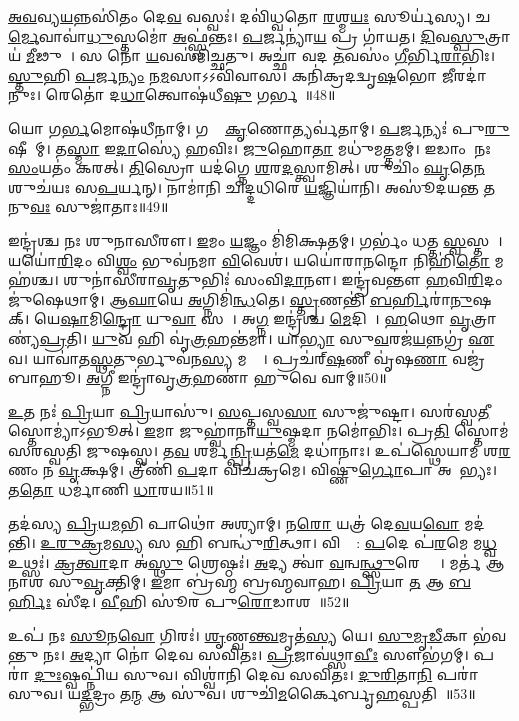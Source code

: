 \ul{𑌅}\ul{𑌵}𑌵𑍍𑌯\ul{𑌯}𑌨𑍍𑌨𑌸𑌿॑𑌤𑌂 𑌦𑍇\ul{𑌵} 𑌵𑌸𑍍𑌵𑌃॑।
𑌦𑌵𑌿॑𑌧𑍍𑌵𑌤𑍋 \ul{𑌰}𑌶𑍍𑌮\ul{𑌯𑌃} 𑌸𑍂𑌰𑍍𑌯॑𑌸𑍍𑌯।
𑌚\ul{𑌰𑍍𑌮𑍇}𑌵𑌾𑌵𑌾॑\ul{𑌧𑍁}𑌸𑍍𑌤𑌮𑍋॑ \ul{𑌅}𑌫𑍍𑌸𑍍𑌵॑𑌨𑍍𑌤𑌃।
\ul{𑌪}𑌰𑍍𑌜𑌨𑍍𑌯𑌾॑\ul{𑌯} 𑌪𑍍𑌰 𑌗𑌾॑𑌯𑌤।
\ul{𑌦𑌿}𑌵\ul{𑌸𑍍𑌪𑍁}𑌤𑍍𑌰𑌾𑌯॑ \ul{𑌮𑍀}𑌢𑍁𑌷𑍇᳚।
𑌸 𑌨𑍋॑ \ul{𑌯}𑌵𑌸॑𑌮𑌿𑌚𑍍𑌛𑌤𑍁।
𑌅𑌚𑍍𑌛𑌾॑ 𑌵𑌦 \ul{𑌤}𑌵𑌸𑌂॑ \ul{𑌗𑍀}𑌰𑍍𑌭𑌿\ul{𑌰𑌾}𑌭𑌿𑌃।
\ul{𑌸𑍍𑌤𑍁}𑌹𑌿 \ul{𑌪}𑌰𑍍𑌜\ul{𑌨𑍍𑌯𑌂} 𑌨\ul{𑌮}𑌸𑌾\-𑌽𑌽𑌵𑌿॑𑌵𑌾𑌸।
𑌕𑌨𑌿॑𑌕𑍍𑌰𑌦𑌦𑍍𑌵𑍃\ul{𑌷}𑌭𑍋 \ul{𑌜𑍀}𑌰𑌦𑌾॑𑌨𑍁𑌃।
𑌰𑍇𑌤𑍋॑ 𑌦\ul{𑌧𑌾}𑌤𑍍𑌵𑍋𑌷॑𑌧𑍀\ul{𑌷𑍁} 𑌗𑌰𑍍𑌭𑌮𑍍᳚॥48॥

𑌯𑍋 𑌗\ul{𑌰𑍍𑌭}𑌮𑍋𑌷॑𑌧𑍀𑌨𑌾𑌮𑍍।
𑌗𑌵𑌾𑌂᳚ \ul{𑌕𑍃}𑌣𑍋𑌤𑍍𑌯𑌰𑍍𑌵॑𑌤𑌾𑌮𑍍।
\ul{𑌪}𑌰𑍍𑌜𑌨𑍍𑌯𑌃॑ 𑌪𑍁\ul{𑌰𑍁}𑌷𑍀𑌣𑌾᳚𑌮𑍍।
𑌤\ul{𑌸𑍍𑌮𑌾} 𑌇\ul{𑌦𑌾}𑌸𑍍𑌯𑍇॑ \ul{𑌹}𑌵𑌿𑌃।
\ul{𑌜𑍁}𑌹𑍋\ul{𑌤𑌾} 𑌮𑌧𑍁॑𑌮𑌤𑍍𑌤𑌮𑌮𑍍।
𑌇𑌡𑌾𑌂 𑌨𑌃 \ul{𑌸𑌂}𑌯𑌤𑌂॑ 𑌕𑌰𑌤𑍍।
\ul{𑌤𑌿}𑌸𑍍𑌰𑍋 𑌯𑌦॑𑌗𑍍𑌨𑍇 \ul{𑌶}𑌰\ul{𑌦}𑌸𑍍𑌤𑍍𑌵𑌾𑌮𑌿𑌤𑍍।
𑌶𑍁𑌚𑌿𑌂॑ \ul{𑌘𑍃}𑌤𑍇\ul{𑌨} 𑌶𑍁𑌚॑𑌯𑌃 𑌸\ul{𑌪}𑌰𑍍𑌯𑌨𑍍।
𑌨𑌾𑌮𑌾॑𑌨𑌿 𑌚𑌿𑌦𑍍𑌦𑌧𑌿𑌰𑍇 \ul{𑌯}𑌜𑍍𑌞𑌿𑌯𑌾॑𑌨𑌿।
𑌅𑌸𑍂॑𑌦𑌯𑌨𑍍𑌤 \ul{𑌤}𑌨𑍁\ul{𑌵𑌃} 𑌸𑍁𑌜𑌾॑𑌤𑌾𑌃॥49॥

𑌇𑌨𑍍𑌦𑍍𑌰॑𑌶𑍍𑌚 𑌨𑌃 𑌶𑍁𑌨𑌾𑌸𑍀𑌰𑍗।
\ul{𑌇}𑌮𑌂 \ul{𑌯}𑌜𑍍𑌞𑌂 𑌮𑌿॑𑌮𑌿𑌕𑍍𑌷𑌤𑌮𑍍।
𑌗𑌰𑍍𑌭𑌂॑ 𑌧𑌤𑍍𑌤 \ul{𑌸𑍍𑌵}𑌸𑍍𑌤𑌯𑍇᳚।
𑌯𑌯𑍋॑\ul{𑌰𑌿}𑌦𑌂 𑌵𑌿\ul{𑌶𑍍𑌵𑌂} 𑌭𑍁𑌵॑𑌨𑌮𑌾 \ul{𑌵𑌿}𑌵𑍇𑌶॑।
𑌯𑌯𑍋॑𑌰𑌾\ul{𑌨}𑌨𑍍𑌦𑍋 𑌨𑌿𑌹𑌿॑\ul{𑌤𑍋} 𑌮𑌹॑𑌶𑍍𑌚।
𑌶𑍁𑌨𑌾॑𑌸𑍀𑌰𑌾\ul{𑌵𑍃}𑌤𑍁𑌭𑌿𑌃॑ 𑌸𑌂𑌵𑌿\ul{𑌦𑌾}𑌨𑍗।
𑌇𑌨𑍍𑌦𑍍𑌰॑𑌵𑌨𑍍𑌤𑍗 \ul{𑌹}𑌵𑌿\ul{𑌰𑌿}𑌦𑌂 𑌜𑍁॑𑌷𑍇𑌥𑌾𑌮𑍍।
𑌆\ul{𑌘𑌾}𑌯𑍇 \ul{𑌅}𑌗𑍍𑌨𑌿𑌮𑌿॑\ul{𑌨𑍍𑌧}𑌤𑍇।
\ul{𑌸𑍍𑌤𑍃}𑌣𑌨𑍍𑌤𑌿॑ \ul{𑌬}\ul{𑌰𑍍}𑌹𑌿𑌰𑌾॑\ul{𑌨𑍁}𑌷𑌕𑍍।
𑌯𑍇\ul{𑌷𑌾}𑌮𑌿\ul{𑌨𑍍𑌦𑍍𑌰𑍋} 𑌯𑍁\ul{𑌵𑌾} 𑌸𑌖𑌾᳚।
𑌅\ul{𑌗𑍍𑌨} 𑌇𑌨𑍍𑌦𑍍𑌰॑𑌶𑍍𑌚 \ul{𑌮𑍇}𑌦𑌿𑌨𑌾᳚।
\ul{𑌹}𑌥𑍋 \ul{𑌵𑍃}𑌤𑍍𑌰𑌾𑌣𑍍𑌯॑\ul{𑌪𑍍𑌰}𑌤𑌿।
\ul{𑌯𑍁}𑌵 𑌹𑌿 𑌵𑍃॑\ul{𑌤𑍍𑌰}𑌹𑌨𑍍𑌤॑𑌮𑌾।
𑌯𑌾\ul{𑌭𑍍𑌯𑌾}\ul{} 𑌸𑍁\ul{𑌵}𑌰𑌜॑\ul{𑌯}𑌨𑍍𑌨𑌗𑍍𑌰॑ \ul{𑌏}𑌵।
𑌯𑌾𑌵𑌾॑𑌤\ul{𑌸𑍍𑌥}𑌤𑍁𑌰𑍍𑌭𑍁𑌵॑𑌨\ul{𑌸𑍍𑌯} 𑌮𑌧𑍍𑌯𑍇᳚।
𑌪𑍍𑌰𑌚॑𑌰𑍍‌\mbox{}\ul{𑌷}𑌣𑍀 𑌵𑍃॑𑌷\ul{𑌣𑌾} 𑌵𑌜𑍍𑌰॑𑌬𑌾𑌹𑍂।
\ul{𑌅}𑌗𑍍𑌨𑍀 𑌇𑌨𑍍𑌦𑍍𑌰𑌾॑𑌵𑍃\ul{𑌤𑍍𑌰}𑌹𑌣𑌾॑ 𑌹𑍁𑌵𑍇 𑌵𑌾𑌮𑍍॥50॥\anuvakamend[𑌮\ul{𑌨} 𑌇\ul{𑌨𑍍𑌦𑍍𑌰𑍋} 𑌗𑌵𑌿॑𑌷𑍍𑌟𑌿\ul{𑌷𑍁} 𑌤\ul{𑌨𑍍𑌤𑍁𑌂} 𑌗\ul{𑌰𑍍𑌭}\ul{\dng{ꣳ}} 𑌸𑍁𑌜𑌾॑\ul{𑌤𑌾𑌃} 𑌸𑌖𑌾॑ \ul{𑌸}𑌪𑍍𑌤 𑌚॑]

\ul{𑌉}𑌤 𑌨𑌃॑ \ul{𑌪𑍍𑌰𑌿}𑌯𑌾 \ul{𑌪𑍍𑌰𑌿}𑌯𑌾𑌸𑍁॑।
\ul{𑌸}𑌪𑍍𑌤𑌸𑍍𑌵\ul{𑌸𑌾} 𑌸𑍁𑌜𑍁॑𑌷𑍍𑌟𑌾।
𑌸𑌰॑𑌸𑍍𑌵\ul{𑌤𑍀} 𑌸𑍍𑌤𑍋𑌮𑍍𑌯𑌾॑\-𑌽𑌭𑍂𑌤𑍍।
\ul{𑌇}𑌮𑌾 𑌜𑍁𑌹𑍍𑌵𑌾॑𑌨𑌾\ul{𑌯𑍁}𑌷𑍍𑌮𑌦𑌾 𑌨𑌮𑍋॑𑌭𑌿𑌃।
𑌪𑍍𑌰\ul{𑌤𑌿} 𑌸𑍍𑌤𑍋𑌮॑ 𑌸𑌰𑌸𑍍𑌵𑌤𑌿 𑌜𑍁𑌷𑌸𑍍𑌵।
𑌤\ul{𑌵} 𑌶𑌰𑍍𑌮॑\ul{𑌨𑍍𑌪𑍍𑌰𑌿}𑌯𑌤॑\ul{𑌮𑍇} 𑌦𑌧𑌾॑𑌨𑌾𑌃।
𑌉𑌪॑𑌸𑍍𑌥𑍇𑌯𑌾𑌮 𑌶\ul{𑌰}𑌣𑌂 𑌨 \ul{𑌵𑍃}𑌕𑍍𑌷𑌮𑍍।
𑌤𑍍𑌰𑍀𑌣𑌿॑ \ul{𑌪}𑌦𑌾 𑌵𑌿𑌚॑𑌕𑍍𑌰𑌮𑍇।
𑌵𑌿𑌷𑍍𑌣𑍁॑\ul{𑌰𑍍𑌗𑍋}𑌪𑌾 𑌅𑌦𑌾᳚𑌭𑍍𑌯𑌃।
𑌤\ul{𑌤𑍋} 𑌧𑌰𑍍𑌮𑌾॑𑌣𑌿 \ul{𑌧𑌾}𑌰𑌯\sn{}॥51॥

𑌤𑌦॑𑌸𑍍𑌯 \ul{𑌪𑍍𑌰𑌿}𑌯\ul{𑌮}𑌭𑌿 𑌪𑌾𑌥𑍋॑ 𑌅𑌶𑍍𑌯𑌾𑌮𑍍।
𑌨\ul{𑌰𑍋} 𑌯𑌤𑍍𑌰॑ 𑌦𑍇\ul{𑌵}𑌯\ul{𑌵𑍋} 𑌮𑌦॑𑌨𑍍𑌤𑌿।
\ul{𑌉}\ul{𑌰𑍁}\ul{𑌕𑍍𑌰}𑌮\ul{𑌸𑍍𑌯} 𑌸 𑌹𑌿 𑌬𑌨𑍍𑌧𑍁॑\ul{𑌰𑌿}𑌤𑍍𑌥𑌾।
𑌵𑌿𑌷𑍍𑌣𑍋᳚: \ul{𑌪}𑌦𑍇 𑌪॑\ul{𑌰}𑌮𑍇 𑌮\ul{𑌧𑍍𑌵} 𑌉𑌥𑍍𑌸𑌃॑।
\ul{𑌕𑍍𑌰}\ul{𑌤𑍍𑌵𑌾}𑌦𑌾 𑌅॑\ul{𑌸𑍍𑌥𑍁} 𑌶𑍍𑌰𑍇𑌷𑍍𑌠𑌃॑।
\ul{𑌅}𑌦𑍍𑌯 𑌤𑍍𑌵𑌾॑ \ul{𑌵}𑌨𑍍𑌵\ul{𑌨𑍍𑌥𑍍𑌸𑍁}𑌰𑍇𑌕𑍍𑌣𑌾𑌃᳚।
𑌮𑌰𑍍𑌤॑ 𑌆𑌨𑌾𑌶 𑌸𑍁\ul{𑌵𑍃}𑌕𑍍𑌤𑌿𑌮𑍍।
\ul{𑌇}𑌮𑌾 𑌬𑍍𑌰॑𑌹𑍍𑌮 𑌬𑍍𑌰𑌹𑍍𑌮𑌵𑌾𑌹।
\ul{𑌪𑍍𑌰𑌿}𑌯𑌾 \ul{𑌤} 𑌆 \ul{𑌬}\ul{𑌰𑍍}𑌹𑌿𑌃 𑌸𑍀॑𑌦।
\ul{𑌵𑍀}𑌹𑌿 𑌸𑍂॑𑌰 𑌪𑍁\ul{𑌰𑍋}𑌡𑌾𑌶𑌮𑍍᳚॥52॥

𑌉𑌪॑ 𑌨𑌃 \ul{𑌸𑍂}𑌨\ul{𑌵𑍋} 𑌗𑌿𑌰𑌃॑।
\ul{𑌶𑍃}𑌣𑍍𑌵\ul{𑌨𑍍𑌤𑍍𑌵}𑌮𑍃𑌤॑\ul{𑌸𑍍𑌯} 𑌯𑍇।
\ul{𑌸𑍁}\ul{𑌮𑍃}\ul{𑌡𑍀}𑌕𑌾 𑌭॑𑌵𑌨𑍍𑌤𑍁 𑌨𑌃।
\ul{𑌅}𑌦𑍍𑌯𑌾 𑌨𑍋॑ 𑌦𑍇𑌵 𑌸𑌵𑌿𑌤𑌃।
\ul{𑌪𑍍𑌰}𑌜𑌾𑌵॑𑌥𑍍𑌸𑌾\ul{𑌵𑍀𑌃} 𑌸𑍗𑌭॑𑌗𑌮𑍍।
𑌪𑌰𑌾॑ \ul{𑌦𑍁𑌃}𑌷𑍍𑌵𑌪𑍍𑌨𑌿॑𑌯 𑌸𑍁𑌵।
𑌵𑌿𑌶𑍍𑌵𑌾॑𑌨𑌿 𑌦𑍇𑌵 𑌸𑌵𑌿𑌤𑌃।
\ul{𑌦𑍁}\ul{𑌰𑌿}𑌤𑌾\ul{𑌨𑌿} 𑌪𑌰𑌾॑ 𑌸𑍁𑌵।
𑌯\ul{𑌦𑍍𑌭}𑌦𑍍𑌰𑌂 𑌤\ul{𑌨𑍍𑌮} 𑌆 𑌸𑍁॑𑌵।
𑌶𑍁𑌚𑌿॑\ul{𑌮}𑌰𑍍𑌕𑍈𑌰𑍍𑌬𑍃\ul{𑌹}𑌸𑍍𑌪𑌤𑌿𑌮𑍍᳚॥53॥

